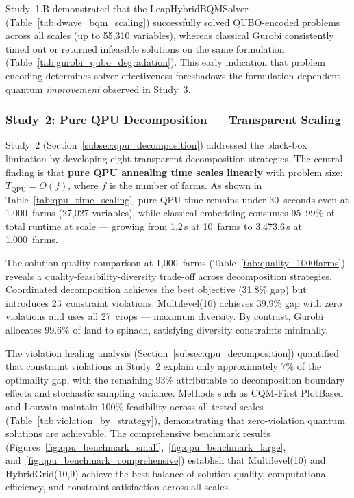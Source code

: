 Study~1.B demonstrated that the LeapHybridBQMSolver (Table~\ref{tab:dwave_bqm_scaling}) successfully solved QUBO-encoded problems across all scales (up to 55,310 variables), whereas classical Gurobi consistently timed out or returned infeasible solutions on the same formulation (Table~\ref{tab:gurobi_qubo_degradation}). This early indication that problem encoding determines solver effectiveness foreshadows the formulation-dependent quantum \textit{improvement} observed in Study~3.

\subsubsection{Study~2: Pure QPU Decomposition --- Transparent Scaling}

Study~2 (Section~\ref{subsec:qpu_decomposition}) addressed the black-box limitation by developing eight transparent decomposition strategies. The central finding is that \textbf{pure QPU annealing time scales linearly} with problem size: $T_{\text{QPU}} = O(f)$, where $f$ is the number of farms. As shown in Table~\ref{tab:qpu_time_scaling}, pure QPU time remains under 30~seconds even at 1,000~farms (27,027 variables), while classical embedding consumes 95--99\% of total runtime at scale --- growing from 1.2\,s at 10~farms to 3,473.6\,s at 1,000~farms.

The solution quality comparison at 1,000~farms (Table~\ref{tab:quality_1000farms}) reveals a quality-feasibility-diversity trade-off across decomposition strategies. Coordinated decomposition achieves the best objective (31.8\% gap) but introduces 23~constraint violations. Multilevel(10) achieves 39.9\% gap with zero violations and uses all 27~crops --- maximum diversity. By contrast, Gurobi allocates 99.6\% of land to spinach, satisfying diversity constraints minimally.

The violation healing analysis (Section~\ref{subsec:qpu_decomposition}) quantified that constraint violations in Study~2 explain only approximately 7\% of the optimality gap, with the remaining 93\% attributable to decomposition boundary effects and stochastic sampling variance. Methods such as CQM-First PlotBased and Louvain maintain 100\% feasibility across all tested scales (Table~\ref{tab:violation_by_strategy}), demonstrating that zero-violation quantum solutions are achievable. The comprehensive benchmark results (Figures~\ref{fig:qpu_benchmark_small},~\ref{fig:qpu_benchmark_large}, and~\ref{fig:qpu_benchmark_comprehensive}) establish that Multilevel(10) and HybridGrid(10,9) achieve the best balance of solution quality, computational efficiency, and constraint satisfaction across all scales.


